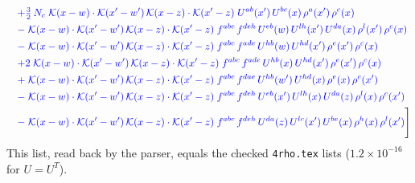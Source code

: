 \documentclass[10pt]{article}
\numberwithin{equation}{section}
\begin{document}
\begin{align}
&\quad{\color{blue}+\tfrac{3}{2}\,N_c\;\mathcal{K}(x-w)\cdot\mathcal{K}(x'-w')\,\mathcal{K}(x-z)\cdot\mathcal{K}(x'-z)\;U^{ab}(x')\,U^{bc}(x)\,\rho^{a}(x')\,\rho^{c}(x)}\notag\\
&\quad{\color{blue}-\;\mathcal{K}(x-w)\cdot\mathcal{K}(x'-w')\,\mathcal{K}(x-z)\cdot\mathcal{K}(x'-z)\;f^{abc}\,f^{deh}\,U^{eb}(w)\,U^{lh}(x')\,U^{da}(x)\,\rho^{l}(x')\,\rho^{c}(x)}\notag\\
&\quad{\color{blue}-\;\mathcal{K}(x-w)\cdot\mathcal{K}(x'-w')\,\mathcal{K}(x-z)\cdot\mathcal{K}(x'-z)\;f^{abc}\,f^{ade}\,U^{hb}(w)\,U^{hd}(x')\,\rho^{e}(x')\,\rho^{c}(x)}\notag\\
&\quad{\color{blue}+2\;\mathcal{K}(x-w)\cdot\mathcal{K}(x'-w')\,\mathcal{K}(x-z)\cdot\mathcal{K}(x'-z)\;f^{abc}\,f^{ade}\,U^{hb}(x)\,U^{hd}(x')\,\rho^{e}(x')\,\rho^{c}(x)}\notag\\
&\quad{\color{blue}+\;\mathcal{K}(x-w)\cdot\mathcal{K}(x'-w')\,\mathcal{K}(x-z)\cdot\mathcal{K}(x'-z)\;f^{abc}\,f^{dae}\,U^{hb}(w')\,U^{hd}(x)\,\rho^{e}(x)\,\rho^{c}(x')}\notag\\
&\quad{\color{blue}-\;\mathcal{K}(x-w)\cdot\mathcal{K}(x'-w')\,\mathcal{K}(x-z)\cdot\mathcal{K}(x'-z)\;f^{abc}\,f^{deh}\,U^{eb}(x')\,U^{lh}(x)\,U^{da}(z)\,\rho^{l}(x)\,\rho^{c}(x')}\notag\\
&\quad{\color{blue}-\;\mathcal{K}(x-w)\cdot\mathcal{K}(x'-w')\,\mathcal{K}(x-z)\cdot\mathcal{K}(x'-z)\;f^{abc}\,f^{deh}\,U^{da}(z)\,U^{lc}(x')\,U^{be}(x)\,\rho^{h}(x)\,\rho^{l}(x')}\Bigg]\label{eq:four}
\end{align}
This list, read back by the parser, equals the checked \texttt{4rho.tex} lists ($1.2\times10^{-16}$ for $U=U^T$).

\end{document}
